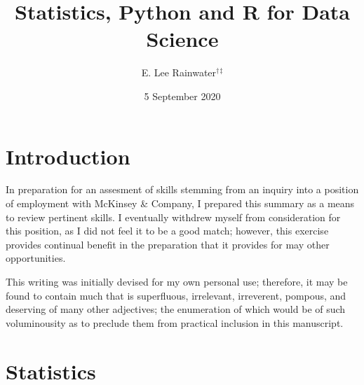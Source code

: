 \documentclass[12pt]{article}
\title{Statistics, Python and R for Data Science}
\author{E. Lee Rainwater$^{\dag}$$^{\ddag}$}
\date{5 September 2020}
\begin{document}
\maketitle
{} %
\section{Introduction}
In preparation for an assesment of skills stemming from an inquiry into a position of employment with McKinsey \& Company\texttrademark, I prepared this summary as a means to review pertinent skills. I eventually withdrew myself from consideration for this position, as I did not feel it to be a good match; however, this exercise provides continual benefit in the preparation that it provides for may other opportunities.

This writing was initially devised for my own personal use; therefore, it may be found to contain much that is superfluous, irrelevant, irreverent, pompous, and deserving of many other adjectives; the enumeration of which would be of such voluminousity as to preclude them from practical inclusion in this manuscript.

\section{Statistics}
\end{document}
